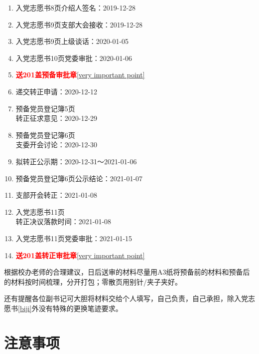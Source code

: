 \documentclass[fontset=windows]{ctexart}
\begin{document}
\begin{tcolorbox}
\begin{multicols}{2}
\begin{enumerate}
            \item 入党志愿书8页介绍人签名：2019-12-28
            \item 入党志愿书9页支部大会接收：2019-12-28
            \item 入党志愿书9页上级谈话：2020-01-05
            \item 入党志愿书10页党委审批：2020-01-06
            \item \textcolor{red}{\textbf{送201盖预备审批章}}\ref{very important point}
            \item 递交转正申请：2020-12-12
            \item 预备党员登记簿5页\\转正征求意见：2020-12-29
            \item 预备党员登记簿6页\\支委开会讨论：2020-12-30
            \item 拟转正公示期：2020-12-31～2021-01-06
            \item 预备党员登记簿6页公示结论：2021-01-07
            \item 支部开会转正：2021-01-08
            \item 入党志愿书11页\\转正决议落款时间：2021-01-08
            \item 入党志愿书11页党委审批：2021-01-15
            \item \textcolor{red}{\textbf{送201盖转正审批章}}\ref{very important point}
        \end{enumerate}
    \end{multicols}
\end{tcolorbox}

根据校办老师的合理建议，日后送审的材料尽量用A3纸将预备前的材料和预备后的材料按时间梳理，分开打包；零散页用别针/夹子夹好。

还有提醒各位副书记可大胆将材料交给个人填写，自己负责，自己承担，除入党志愿书\ref{biji}外没有特殊的更换笔迹要求。

\newpage
\section{注意事项}
\end{document}
